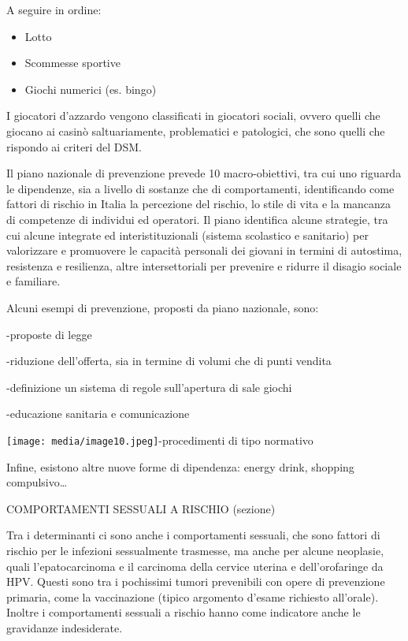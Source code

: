 \documentclass[]{article}
\begin{document}
A seguire in ordine:

\begin{itemize}
\item
  Lotto
\item
  Scommesse sportive
\item
  Giochi numerici (es. bingo)
\end{itemize}

I giocatori d'azzardo vengono classificati in giocatori sociali, ovvero
quelli che giocano ai casinò saltuariamente, problematici e patologici,
che sono quelli che rispondo ai criteri del DSM.

Il piano nazionale di prevenzione prevede 10 macro-obiettivi, tra cui
uno riguarda le dipendenze, sia a livello di sostanze che di
comportamenti, identificando come fattori di rischio in Italia la
percezione del rischio, lo stile di vita e la mancanza di competenze di
individui ed operatori. Il piano identifica alcune strategie, tra cui
alcune integrate ed interistituzionali (sistema scolastico e sanitario)
per valorizzare e promuovere le capacità personali dei giovani in
termini di autostima, resistenza e resilienza, altre intersettoriali per
prevenire e ridurre il disagio sociale e familiare.

Alcuni esempi di prevenzione, proposti da piano nazionale, sono:

-proposte di legge

-riduzione dell'offerta, sia in termine di volumi che di punti vendita

-definizione un sistema di regole sull'apertura di sale giochi

-educazione sanitaria e comunicazione

\texttt{[image: media/image10.jpeg]}-procedimenti di tipo normativo

Infine, esistono altre nuove forme di dipendenza: energy drink, shopping
compulsivo\ldots{}

COMPORTAMENTI SESSUALI A RISCHIO (sezione)

Tra i determinanti ci sono anche i comportamenti sessuali, che sono
fattori di rischio per le infezioni sessualmente trasmesse, ma anche per
alcune neoplasie, quali l'epatocarcinoma e il carcinoma della cervice
uterina e dell'orofaringe da HPV. Questi sono tra i pochissimi tumori
prevenibili con opere di prevenzione primaria, come la vaccinazione
(tipico argomento d'esame richiesto all'orale). Inoltre i comportamenti
sessuali a rischio hanno come indicatore anche le gravidanze
indesiderate.
\end{document}
